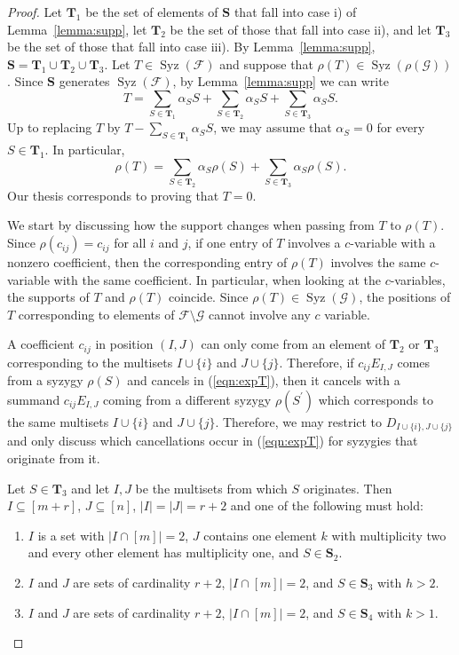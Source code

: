 \documentclass[10pt,a4paper]{amsart}
\DeclareMathOperator{\Syz}{Syz}
\begin{document}
\begin{proof} 
Let $\mathbf{T}_1$ be the set of elements of $\mathbf{S}$ that fall into case i) of Lemma~\ref{lemma:supp}, let $\mathbf{T}_2$ be the set of those that fall into case ii), and let $\mathbf{T}_3$ be the set of those that fall into case iii). By Lemma~\ref{lemma:supp}, $\mathbf{S}=\mathbf{T}_1\cup\mathbf{T}_2\cup\mathbf{T}_3$. 
Let $T\in \Syz(\mathcal{F})$ and suppose that $\rho(T)\in \Syz(\rho(\mathcal{G}))$.
Since $\mathbf{S}$ generates $\Syz(\mathcal{F})$, by Lemma~\ref{lemma:supp} we can write
\begin{equation}\label{eqn:expT}
T=\sum_{S\in\mathbf{T}_1}\alpha_S S + 
\sum_{S\in\mathbf{T}_2}\alpha_S S + 
\sum_{S\in\mathbf{T}_3} \alpha_S S.
\end{equation}
Up to replacing $T$ by $T-\sum_{S\in\mathbf{T}_1}\alpha_S S$, we may assume that $\alpha_S=0$ for every $S\in\mathbf{T}_1$. In particular,
\begin{equation}\label{eqn:rhoT}
\rho(T) = \sum_{S\in\mathbf{T}_2}\alpha_S \rho(S) + 
\sum_{S\in\mathbf{T}_3} \alpha_S\rho(S).
\end{equation}
Our thesis corresponds to proving that $T=0$. 

We start by discussing how the support changes when passing from $T$ to $\rho(T)$. Since $\rho(c_{ij})=c_{ij}$ for all $i$ and $j$, if one entry of $T$ involves a $c$-variable with a nonzero coefficient, then the corresponding entry of $\rho(T)$ involves the same $c$-variable with the same coefficient. In particular, when looking at the $c$-variables, the supports of $T$ and $\rho(T)$ coincide. Since $\rho(T)\in\Syz(\mathcal{G})$, the positions of $T$ corresponding to elements of $\mathcal{F}\setminus\mathcal{G}$ cannot involve any $c$ variable.

A coefficient $c_{ij}$ in position $(I,J)$ can only come from an element of $\mathbf{T}_2$ or $\mathbf{T}_3$ corresponding to the multisets $I\cup\{i\}$ and $J\cup\{j\}$. Therefore, if $c_{ij}E_{I,J}$ comes from a syzygy $\rho(S)$ and cancels in (\ref{eqn:expT}), then it cancels with a summand $c_{ij}E_{I,J}$ coming from a different syzygy $\rho(S^\prime)$ which corresponds to the same multisets $I\cup\{i\}$ and $J\cup\{j\}$. Therefore, we may restrict to $D_{I\cup\{i\},J\cup\{j\}}$ and only discuss which cancellations occur in (\ref{eqn:expT}) for syzygies that originate from it. 

Let $S\in\mathbf{T}_3$ and let $I,J$ be the multisets from which $S$ originates. Then $I\subseteq[m+r]$, $J\subseteq[n]$, $|I|=|J|=r+2$ and one of the following must hold:
\begin{enumerate}
\item $I$ is a set with $|I\cap[m]|=2$, $J$ contains one element $k$ with multiplicity two and every other element has multiplicity one,  and $S\in\mathbf{S}_2$.
\item $I$ and $J$ are sets of cardinality $r+2$, $|I\cap[m]|=2$, and $S\in\mathbf{S}_3$ with $h>2$.
\item $I$ and $J$ are sets of cardinality $r+2$, $|I\cap[m]|=2$, and $S\in\mathbf{S}_4$ with $k>1$.
\end{enumerate}


\end{proof}
\end{document}

